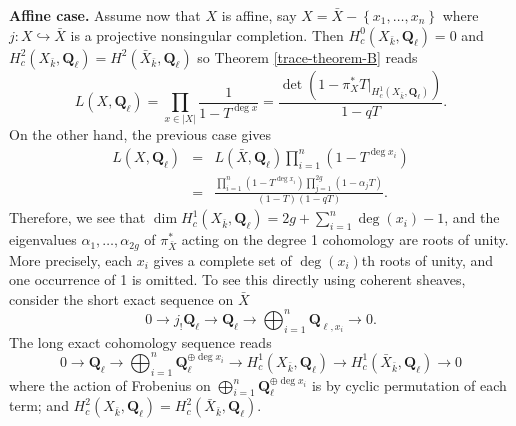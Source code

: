 \medskip\noindent
{\bf Affine case.}
Assume now that $X$ is affine, say $X= \bar X-\left\{x_1, \ldots, x_n\right\}$
where $j : X \hookrightarrow \bar X$ is a projective nonsingular completion.
Then $H_c^0(X_{\bar k}, \mathbf{Q}_\ell) = 0$ and $H_c^2(X_{\bar k},
\mathbf{Q}_\ell) = H^2(\bar X_{\bar k}, \mathbf{Q}_\ell)$ so
Theorem \ref{trace-theorem-B}
reads
$$
L(X, \mathbf{Q}_\ell) = \prod_{x \in |X|}\frac{1}{1 - T^{\deg x}} =
\frac{\det(1-\pi_X^*T |_{H_c^1(X_{\bar k}, \mathbf{Q}_\ell)})}{1 - qT}.
$$
On the other hand, the previous case gives
\begin{eqnarray*}
L(X, \mathbf{Q}_\ell) & = & L(\bar X,
\mathbf{Q}_\ell)\prod_{i = 1}^n\left(1-T^{\deg x_i}\right) \\
& = & \frac{\prod_{i = 1}^n(1-T^{\deg
x_i})\prod_{j = 1}^{2g}(1-\alpha_jT)}{(1-T)(1-qT)}.
\end{eqnarray*}
Therefore, we see that $\dim H_c^1(X_{\bar k}, \mathbf{Q}_\ell) =
2g+\sum_{i = 1}^n \deg(x_i)-1$, and the eigenvalues $\alpha_1, \ldots,
\alpha_{2g}$ of $\pi_{\bar X}^*$ acting on the degree 1 cohomology are roots of
unity. More precisely, each $x_i$ gives a complete set of $\deg(x_i)$th roots
of unity, and one occurrence of 1 is omitted. To see this directly using
coherent sheaves, consider the short exact sequence on $\bar X$
$$
0\to j_!\mathbf{Q}_\ell\to \mathbf{Q}_\ell\to\bigoplus_{i = 1}^n
\mathbf{Q}_{\ell, x_i}\to 0.
$$
The long exact cohomology sequence reads
$$
0\to \mathbf{Q}_\ell \to \bigoplus_{i = 1}^n \mathbf{Q}_\ell^{\oplus \deg x_i}
\to H_c^1(X_{\bar k}, \mathbf{Q}_\ell) \to H_c^1(\bar X_{\bar k},
\mathbf{Q}_\ell)\to 0
$$
where the action of Frobenius on $\bigoplus_{i = 1}^n \mathbf{Q}_\ell^{\oplus
\deg x_i}$ is by cyclic permutation of each term; and $H_c^2(X_{\bar k},
\mathbf{Q}_\ell) = H_c^2(\bar X_{\bar k}, \mathbf{Q}_\ell)$.

